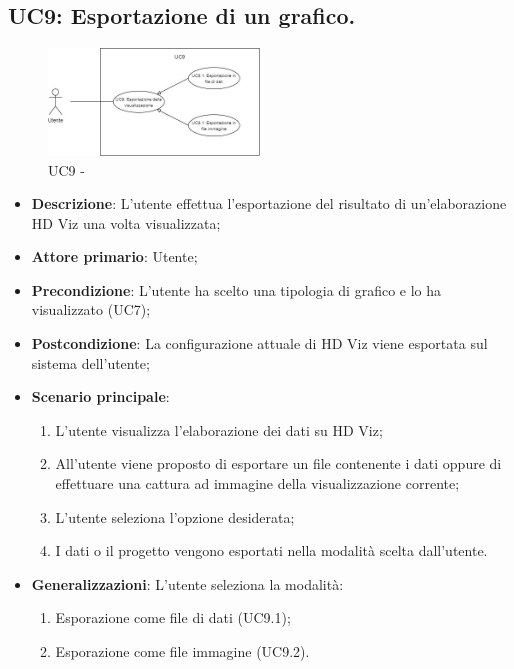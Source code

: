 \subsection{UC9: Esportazione di un grafico.}
\label{sub:uc9}

\begin{figure}[h]
    \centering
    \includegraphics[width=0.5\textwidth]{componenti/casi-duso/diagrammi/UC9.jpg}
    \caption{UC9 - }
    \label{fig:UC9}
\end{figure}


\begin{itemize}
    \item{\textbf{Descrizione}}: L'utente effettua l'esportazione del risultato di un'elaborazione HD Viz una volta visualizzata;
    \item{\textbf{Attore primario}}: Utente;
    \item{\textbf{Precondizione}}: L'utente ha scelto una tipologia di grafico e lo ha visualizzato (UC7);
    \item{\textbf{Postcondizione}}: La configurazione attuale di HD Viz viene esportata sul sistema dell'utente;
    \item{\textbf{Scenario principale}}:
    \begin{enumerate}
        \item   L'utente visualizza l'elaborazione dei dati su HD Viz;
        \item   All'utente viene proposto di esportare un file contenente i dati oppure 
                di effettuare una cattura ad immagine della visualizzazione corrente;
        \item   L'utente seleziona l'opzione desiderata;
        \item   I dati o il progetto vengono esportati nella modalità scelta dall'utente.
    \end{enumerate}
    
    \item{\textbf{Generalizzazioni}}: L'utente seleziona la modalità:
    \begin{enumerate}
        \item   Esporazione come file di dati (UC9.1);
        \item   Esporazione come file immagine (UC9.2).
    \end{enumerate} 
\end{itemize}

